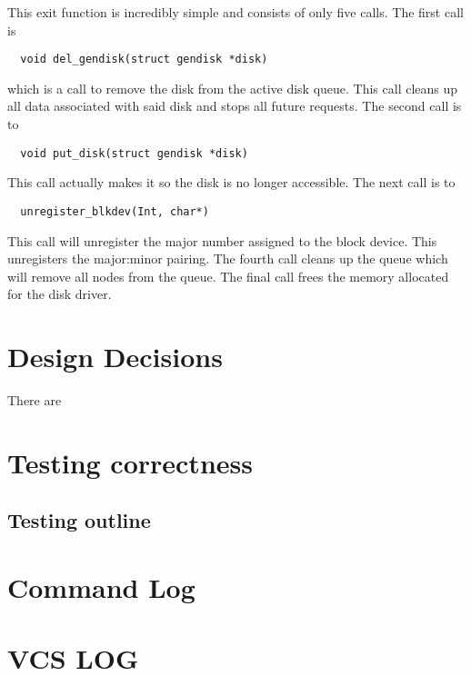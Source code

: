\documentclass[onecolumn, draftclsnofoot,10pt, compsoc]{IEEEtran}
\begin{document}
    This exit function is incredibly simple and consists of only five calls. The first call is \begin{verbatim}  void del_gendisk(struct gendisk *disk) \end{verbatim} which is a call to remove the disk from the active disk queue. This call cleans up all data associated with said disk and stops all future requests. The second call is to \begin{verbatim}  void put_disk(struct gendisk *disk) \end{verbatim} This call actually makes it so the disk is no longer accessible. The next call is to \begin{verbatim}  unregister_blkdev(Int, char*) \end{verbatim} This call will unregister the major number assigned to the block device. This unregisters the major:minor pairing. The fourth call cleans up the queue which will remove all nodes from the queue. The final call frees the memory allocated for the disk driver.

	\section{Design Decisions}
    
    There are 

	\section{Testing correctness}

	\subsection{Testing outline}

	\section{Command Log}

	\section{VCS LOG}

        
\end{document}
